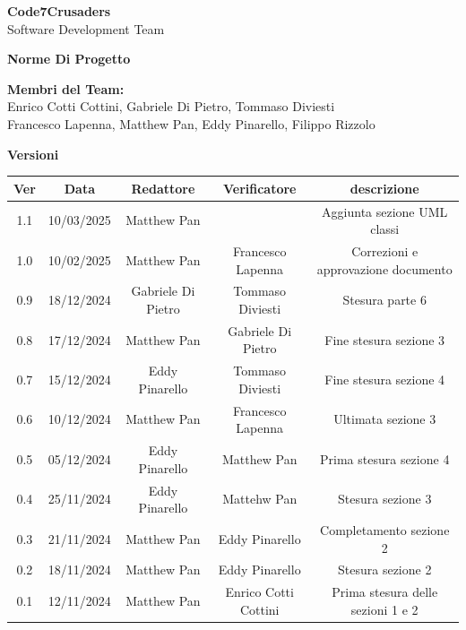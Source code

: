 \documentclass{article}
\begin{document}
\begin{titlepage}
    \vspace{1cm}
    
    {\Huge \textbf{Code7Crusaders}}\\
    \vspace{0.5cm}
    {\Large Software Development Team}\\
    \vspace{2cm}
    
    \large \textbf{Norme Di Progetto}
    \vspace{3.9cm}

    \textbf{Membri del Team:}\\
    Enrico Cotti Cottini, Gabriele Di Pietro, Tommaso Diviesti \\
    Francesco Lapenna, Matthew Pan, Eddy Pinarello, Filippo Rizzolo \\
    \vspace{0.5cm}
    
    \vspace{1cm}
\end{titlepage}



\newpage
\begin{center}
    \textbf{Versioni}
    \\
    \vspace{0.3cm}
    \begin{tabular}{|c|c|c|c|c|}
        \hline
        \textbf{Ver} & \textbf{Data} & \textbf{Redattore} & \textbf{Verificatore} & \textbf{descrizione}\\
        \hline
        1.1 & 10/03/2025 & Matthew Pan &  & Aggiunta sezione UML classi \\
        1.0 & 10/02/2025 & Matthew Pan & Francesco Lapenna & Correzioni e approvazione documento \\ 
        0.9 & 18/12/2024 & Gabriele Di Pietro & Tommaso Diviesti & Stesura parte 6 \\ 
        0.8 & 17/12/2024 & Matthew Pan &   Gabriele Di Pietro & Fine stesura sezione 3\\
        0.7 & 15/12/2024 & Eddy Pinarello & Tommaso Diviesti & Fine stesura sezione 4\\
        0.6 & 10/12/2024 & Matthew Pan & Francesco Lapenna & Ultimata sezione 3\\
        0.5 & 05/12/2024 & Eddy Pinarello & Matthew Pan       & Prima stesura sezione 4\\
        0.4 & 25/11/2024 & Eddy Pinarello & Mattehw Pan       & Stesura sezione 3\\
        0.3 & 21/11/2024 & Matthew Pan &    Eddy Pinarello    & Completamento sezione 2\\
        0.2 & 18/11/2024 & Matthew Pan &    Eddy Pinarello    & Stesura sezione 2\\
        0.1 & 12/11/2024 & Matthew Pan & Enrico Cotti Cottini & Prima stesura delle sezioni 1 e 2\\
        \hline
    \end{tabular}
\end{center}
\end{document}
